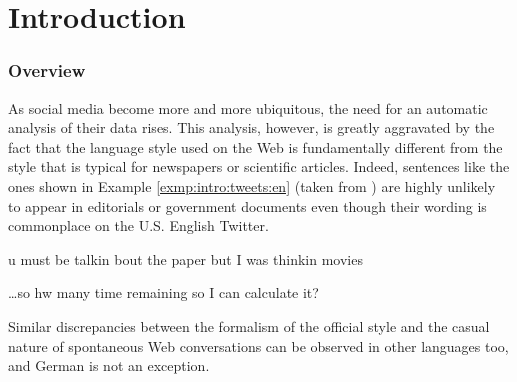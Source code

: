 

\part{Introduction}

\section*{Overview}
As social media become more and more ubiquitous, the need for an
automatic analysis of their data rises.  This analysis, however, is
greatly aggravated by the fact that the language style used on the Web
is fundamentally different from the style that is typical for
newspapers or scientific articles.  Indeed, sentences like the ones
shown in Example \ref{exmp:intro:tweets:en} (taken from
\citet{HanBaldwin:11}) are highly unlikely to appear in editorials or
government documents even though their wording is commonplace on the
U.S. English Twitter.
\begin{example}\label{exmp:intro:tweets:en}
u must be talkin bout the paper but I was thinkin movies

\dots so hw many time remaining so I can calculate it?
\end{example}
Similar discrepancies between the formalism of the official style and the
casual nature of spontaneous Web conversations can be observed in other
languages too, and German is not an exception.


